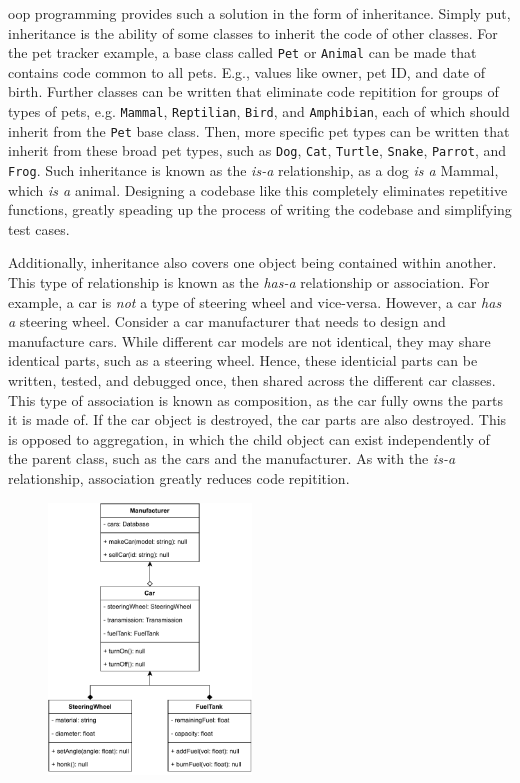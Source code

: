\documentclass[11pt]{article}
\begin{document}
\acrshort{oop} programming provides such a solution in the form of inheritance. Simply put, inheritance is the ability of some classes to inherit the code of other classes. For the pet tracker example, a base \gls{class} called \texttt{Pet} or \texttt{Animal} can be made that contains code common to all pets. E.g., values like owner, pet ID, and date of birth. Further classes can be written that eliminate code repitition for groups of types of pets, e.g. \texttt{Mammal}, \texttt{Reptilian}, \texttt{Bird}, and \texttt{Amphibian}, each of which should inherit from the \texttt{Pet} base class. Then, more specific pet types can be written that inherit from these broad pet types, such as \texttt{Dog}, \texttt{Cat}, \texttt{Turtle}, \texttt{Snake}, \texttt{Parrot}, and \texttt{Frog}. Such inheritance is known as the \textit{is-a} relationship, as a dog \textit{is a} Mammal, which \textit{is a} animal. Designing a codebase like this completely eliminates repetitive functions, greatly speading up the process of writing the codebase and simplifying test cases.

Additionally, inheritance also covers one \gls{object} being contained within another. This type of relationship is known as the \textit{has-a} relationship or \gls{association}. For example, a car is \textit{not} a type of steering wheel and vice-versa. However, a car \textit{has a} steering wheel. Consider a car manufacturer that needs to design and manufacture cars. While different car models are not identical, they may share identical parts, such as a steering wheel. Hence, these identicial parts can be written, tested, and debugged once, then shared across the different car classes. This type of association is known as composition, as the car fully owns the parts it is made of. If the car \gls{object} is destroyed, the car parts are also destroyed. This is opposed to aggregation, in which the child \gls{object} can exist independently of the parent class, such as the cars and the manufacturer. As with the \textit{is-a} relationship, \gls{association} greatly reduces code repitition.

\begin{figure}
    \vspace{0pt}
    \includegraphics[width=0.48\textwidth]{figures/association.pdf}
    \label{fig:association-uml}
\end{figure}
\end{document}
